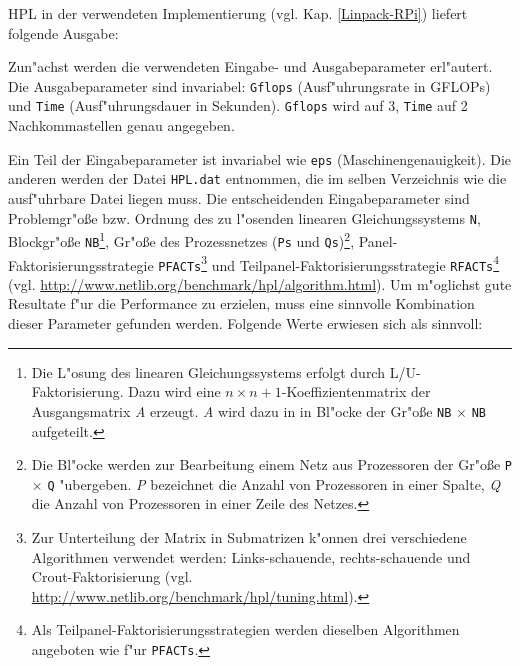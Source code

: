 HPL in der verwendeten Implementierung (vgl. Kap. \ref{Linpack-RPi}) liefert folgende Ausgabe:

Zun"achst werden die verwendeten Eingabe- und Ausgabeparameter erl"autert. Die Ausgabeparameter sind invariabel: \texttt{Gflops} (Ausf"uhrungsrate in GFLOPs) und \texttt{Time} (Ausf"uh\-rungsdauer in Sekunden). \texttt{Gflops} wird auf 3, \texttt{Time} auf 2 Nachkommastellen genau angegeben.

Ein Teil der Eingabeparameter ist invariabel wie \texttt{eps} (Maschinengenauigkeit). Die anderen werden der Datei \texttt{HPL.dat} entnommen, die im selben Verzeichnis wie die ausf"uhrbare Datei liegen muss. Die entscheidenden Eingabeparameter sind Problemgr"o\ss e bzw. Ordnung des zu l"osenden linearen Gleichungssystems \texttt{N}, Blockgr"o\ss e \texttt{NB}\footnote{Die L"osung des linearen Gleichungssystems erfolgt durch L/U-Faktorisierung. Dazu wird eine $n\times n+1$-Koeffizientenmatrix der Ausgangsmatrix \textit{A} erzeugt. \textit{A} wird dazu in in Bl"ocke der Gr"o\ss e \texttt{NB} $\times$ \texttt{NB} aufgeteilt.}, Gr"o\ss e des Prozessnetzes (\texttt{Ps} und \texttt{Qs})\footnote{Die Bl"ocke werden zur Bearbeitung einem Netz aus Prozessoren der Gr"o\ss e \texttt{P} $\times$ \texttt{Q} "ubergeben. \textit{P} bezeichnet die Anzahl von Prozessoren in einer Spalte, \textit{Q} die Anzahl von Prozessoren in einer Zeile des Netzes.}, Panel-Faktorisierungsstrategie \texttt{PFACTs}\footnote{Zur Unterteilung der Matrix in Submatrizen k"onnen drei verschiedene Algorithmen verwendet werden: Links-schauende, rechts-schauende und Crout-Faktorisierung (vgl. \url{http://www.netlib.org/benchmark/hpl/tuning.html}).} und Teilpanel-Faktorisierungsstrategie \texttt{RFACTs}\footnote{Als Teilpanel-Faktorisierungsstrategien werden dieselben Algorithmen angeboten wie f"ur \texttt{PFACTs}.} (vgl. \url{http://www.netlib.org/benchmark/hpl/algorithm.html}). Um m"og\-lichst gute Resultate f"ur die Performance zu erzielen, muss eine sinnvolle Kombination dieser Parameter gefunden werden. Folgende Werte erwiesen sich als sinnvoll: 
